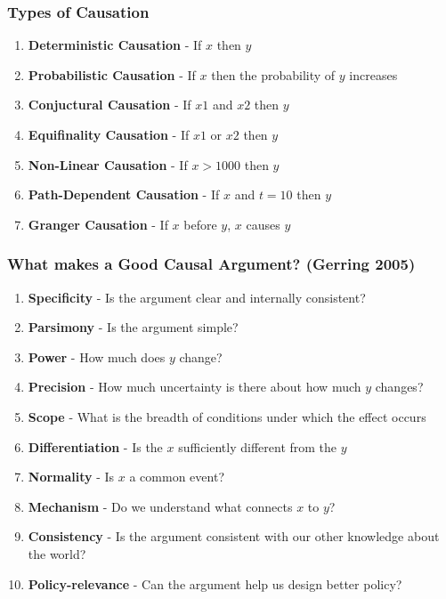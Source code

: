 \documentclass[xcolor=x11names,compress]{beamer}\usepackage[]{graphicx}\usepackage[]{color}
\renewcommand{\(}{\begin{columns}}
\renewcommand{\)}{\end{columns}}
\newcommand{\<}[1]{\begin{column}{#1}}
\renewcommand{\>}{\end{column}}
\begin{document}
\begin{frame}
\frametitle{Types of Causation}
\begin{enumerate}
\item \textbf{Deterministic Causation} - If $x$ then $y$
\item \textbf{Probabilistic Causation} - If $x$ then the probability of $y$ increases
\item \textbf{Conjuctural Causation} - If $x1$ and $x2$ then $y$
\item \textbf{Equifinality Causation} - If $x1$ or $x2$ then $y$
\item \textbf{Non-Linear Causation} - If $x>1000$ then $y$
\item \textbf{Path-Dependent Causation} - If $x$ and $t=10$ then $y$
\item \textbf{Granger Causation} - If $x$ before $y$, $x$ causes $y$
\end{enumerate}
\end{frame}



\begin{frame}
\frametitle{What makes a Good Causal Argument? (Gerring 2005)}
\begin{enumerate}
\item \textbf{Specificity} - Is the argument clear and internally consistent?
\item \textbf{Parsimony} - Is the argument simple?
\item \textbf{Power} - How much does $y$ change?
\item \textbf{Precision} - How much uncertainty is there about how much $y$ changes?
\item \textbf{Scope} - What is the breadth of conditions under which the effect occurs
\item \textbf{Differentiation} - Is the $x$ sufficiently different from the $y$
\item \textbf{Normality} - Is $x$ a common event?
\item \textbf{Mechanism} - Do we understand what connects $x$ to $y$?
\item \textbf{Consistency} - Is the argument consistent with our other knowledge about the world?
\item \textbf{Policy-relevance} - Can the argument help us design better policy?
\end{enumerate}
\end{frame}
\end{document}
